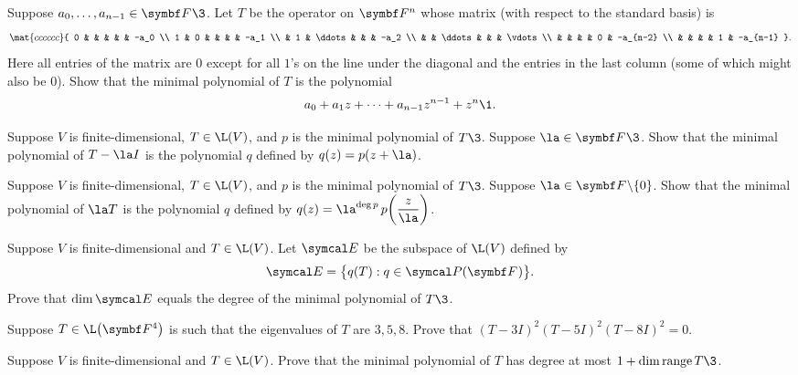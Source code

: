 \begin{exercises}
\exercise
Suppose $a_0, \dots, a_{n-1} \in \F{}\3$. Let $T$ be the operator on $\F n$ whose matrix (with respect to the standard basis) is
\label{8FTAneeded}
\[
\mat{cccccc}{
0 & & & & & -a_0 \\
1 & 0  & & & & -a_1 \\
& 1 & \ddots & & & -a_2 \\
& & \ddots & & & \vdots \\
& & & & 0 & -a_{n-2} \\
& & & & 1 & -a_{n-1} }.
\]
Here all entries of the matrix are $0$ except for all $1$'s on the line under the diagonal and the entries in the last column (some of which might also be $0$). Show that the minimal polynomial of $T$ is the polynomial
\[
a_0 + a_1 z + \cdots + a_{n-1} z^{n-1} + z^n\1.
\]


\exercise
Suppose $V$ is finite-dimensional, $T \in \L(V)$, and $p$ is the minimal polynomial of $T\3$. Suppose $\la \in \F{}\3$.
Show that the minimal polynomial of $T - \la I$ is the polynomial $q$ defined by $q(z) = p(z+\la)$.


\exercise
Suppose $V$ is finite-dimensional, $T \in \L(V)$, and $p$ is the minimal polynomial of $T\3$. Suppose
$\la \in \F{} \sm \br{0}$. Show that the minimal polynomial of $\la T$ is the polynomial $q$ defined by
$q(z) = \la^{\deg p} \, p\paren[\bigg]{\dfrac{z}{\la}}$.


\exercise
Suppose $V$ is finite-dimensional and $T \in \L(V)$. Let $\E$ be the subspace of $\L(V)$ defined by
\[
\E = \br[\big]{ q(T): q \in \P(\F{}) }.
\]
Prove that $\dim \E$ equals the degree of the minimal polynomial of $T\3$.


\exercise
Suppose $T \in \L\paren[\big]{\F{4}}$ is such that the eigenvalues of $T$ are $3, 5, 8$. Prove that
$
(T - 3I)^2 (T - 5I)^2 (T - 8 I)^2 = 0$.


\exercise
Suppose $V$ is finite-dimensional and $T \in \L(V)$. Prove that the minimal polynomial of $T$ has degree at most $1 + \dim \ran T\3$.



\end{exercises}
